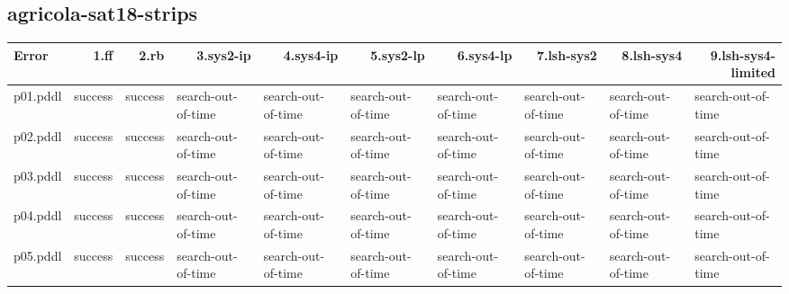 \documentclass{article}
\begin{document}
\hypertarget{error-agricola-sat18-strips}{}
\subsection*{agricola-sat18-strips}

\begin{tabular}{@{}lrrrrrrrrr@{}}
Error & 1.ff & 2.rb & 3.sys2-ip & 4.sys4-ip & 5.sys2-lp & 6.sys4-lp & 7.lsh-sys2 & 8.lsh-sys4 & 9.lsh-sys4-limited \\
\midrule
p01.pddl & \multicolumn{1}{|l|}{success} & \multicolumn{1}{|l|}{success} & \multicolumn{1}{|l|}{search-out-of-time} & \multicolumn{1}{|l|}{search-out-of-time} & \multicolumn{1}{|l|}{search-out-of-time} & \multicolumn{1}{|l|}{search-out-of-time} & \multicolumn{1}{|l|}{search-out-of-time} & \multicolumn{1}{|l|}{search-out-of-time} & \multicolumn{1}{|l|}{search-out-of-time} \\
p02.pddl & \multicolumn{1}{|l|}{success} & \multicolumn{1}{|l|}{success} & \multicolumn{1}{|l|}{search-out-of-time} & \multicolumn{1}{|l|}{search-out-of-time} & \multicolumn{1}{|l|}{search-out-of-time} & \multicolumn{1}{|l|}{search-out-of-time} & \multicolumn{1}{|l|}{search-out-of-time} & \multicolumn{1}{|l|}{search-out-of-time} & \multicolumn{1}{|l|}{search-out-of-time} \\
p03.pddl & \multicolumn{1}{|l|}{success} & \multicolumn{1}{|l|}{success} & \multicolumn{1}{|l|}{search-out-of-time} & \multicolumn{1}{|l|}{search-out-of-time} & \multicolumn{1}{|l|}{search-out-of-time} & \multicolumn{1}{|l|}{search-out-of-time} & \multicolumn{1}{|l|}{search-out-of-time} & \multicolumn{1}{|l|}{search-out-of-time} & \multicolumn{1}{|l|}{search-out-of-time} \\
p04.pddl & \multicolumn{1}{|l|}{success} & \multicolumn{1}{|l|}{success} & \multicolumn{1}{|l|}{search-out-of-time} & \multicolumn{1}{|l|}{search-out-of-time} & \multicolumn{1}{|l|}{search-out-of-time} & \multicolumn{1}{|l|}{search-out-of-time} & \multicolumn{1}{|l|}{search-out-of-time} & \multicolumn{1}{|l|}{search-out-of-time} & \multicolumn{1}{|l|}{search-out-of-time} \\
p05.pddl & \multicolumn{1}{|l|}{success} & \multicolumn{1}{|l|}{success} & \multicolumn{1}{|l|}{search-out-of-time} & \multicolumn{1}{|l|}{search-out-of-time} & \multicolumn{1}{|l|}{search-out-of-time} & \multicolumn{1}{|l|}{search-out-of-time} & \multicolumn{1}{|l|}{search-out-of-time} & \multicolumn{1}{|l|}{search-out-of-time} & \multicolumn{1}{|l|}{search-out-of-time} \\

\end{tabular}
\end{document}
